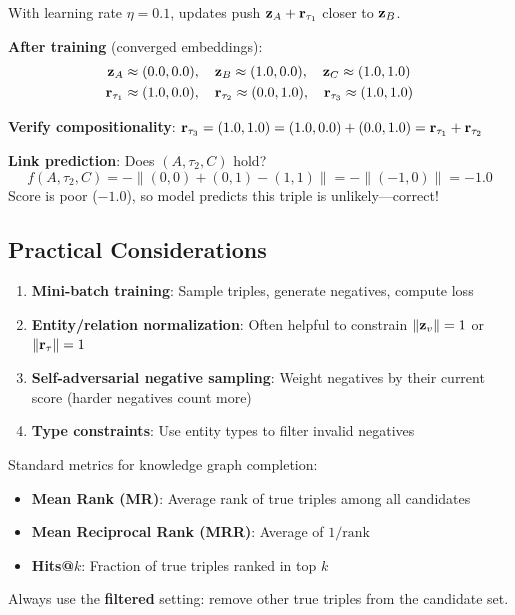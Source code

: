 \begin{notechapter}
\begin{example}
With learning rate $\eta = 0.1$, updates push $\mathbf{z}_A + \mathbf{r}_{\tau_1}$ closer to $\mathbf{z}_B$.

\textbf{After training} (converged embeddings):
\begin{align*}
\mathbf{z}_A &\approx (0.0, 0.0), \quad \mathbf{z}_B \approx (1.0, 0.0), \quad \mathbf{z}_C \approx (1.0, 1.0) \\
\mathbf{r}_{\tau_1} &\approx (1.0, 0.0), \quad \mathbf{r}_{\tau_2} \approx (0.0, 1.0), \quad \mathbf{r}_{\tau_3} \approx (1.0, 1.0)
\end{align*}

\textbf{Verify compositionality}: $\mathbf{r}_{\tau_3} = (1.0, 1.0) = (1.0, 0.0) + (0.0, 1.0) = \mathbf{r}_{\tau_1} + \mathbf{r}_{\tau_2}$ \checkmark

\textbf{Link prediction}: Does $(A, \tau_2, C)$ hold?
\[
f(A, \tau_2, C) = -\|(0, 0) + (0, 1) - (1, 1)\| = -\|(-1, 0)\| = -1.0
\]
Score is poor ($-1.0$), so model predicts this triple is unlikely---correct!
\end{example}

\subsection{Practical Considerations}

\begin{remark}
\leavevmode
\begin{enumerate}
    \item \textbf{Mini-batch training}: Sample triples, generate negatives, compute loss
    \item \textbf{Entity/relation normalization}: Often helpful to constrain $\|\mathbf{z}_v\| = 1$ or $\|\mathbf{r}_\tau\| = 1$
    \item \textbf{Self-adversarial negative sampling}: Weight negatives by their current score (harder negatives count more)
    \item \textbf{Type constraints}: Use entity types to filter invalid negatives
\end{enumerate}
\end{remark}

\begin{remark}
\leavevmode
Standard metrics for knowledge graph completion:
\begin{itemize}
    \item \textbf{Mean Rank (MR)}: Average rank of true triples among all candidates
    \item \textbf{Mean Reciprocal Rank (MRR)}: Average of $1/\text{rank}$
    \item \textbf{Hits@$k$}: Fraction of true triples ranked in top $k$
\end{itemize}
Always use the \textbf{filtered} setting: remove other true triples from the candidate set.
\end{remark}


\end{notechapter}
